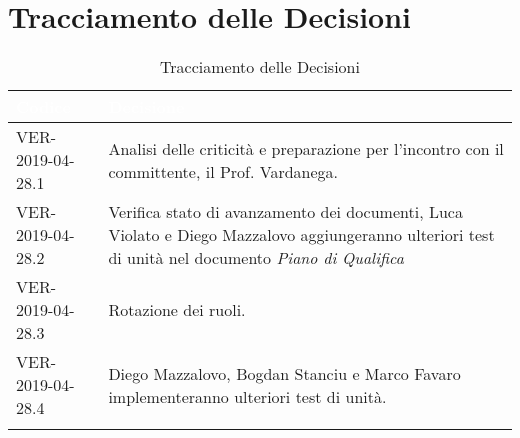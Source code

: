 \newpage
\section{Tracciamento delle Decisioni}

\begin{longtable}{|C{.33\textwidth}|C{.61\textwidth}|}
\hline
{}\textbf{\textcolor{white}{Codice}} & \textbf{\textcolor{white}{Decisione}}\\
\hline
VER-2019-04-28.1 & Analisi delle criticità e preparazione per l'incontro con il committente, il Prof. Vardanega. \\
\hline
{}VER-2019-04-28.2 & Verifica stato di avanzamento dei documenti, Luca Violato e Diego Mazzalovo aggiungeranno ulteriori test di unità nel  documento \textit{Piano di Qualifica}  \\
\hline
VER-2019-04-28.3 & Rotazione dei ruoli. \\
\hline
{}VER-2019-04-28.4 & Diego Mazzalovo, Bogdan Stanciu e Marco Favaro implementeranno ulteriori test di unità.\\
\hline

\caption{Tracciamento delle Decisioni}
\end{longtable}
